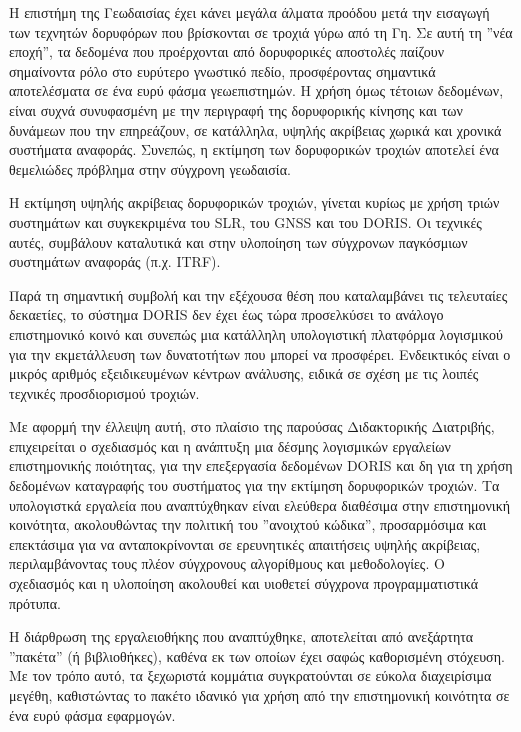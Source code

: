 Η επιστήμη της Γεωδαισίας έχει κάνει μεγάλα άλματα προόδου μετά την εισαγωγή των τεχνητών
δορυφόρων που βρίσκονται σε τροχιά γύρω από τη Γη. Σε αυτή τη ''νέα εποχή'', τα δεδομένα που
προέρχονται από δορυφορικές αποστολές παίζουν σημαίνοντα ρόλο στο ευρύτερο γνωστικό πεδίο,
προσφέροντας σημαντικά αποτελέσματα σε ένα ευρύ φάσμα γεωεπιστημών. Η χρήση όμως τέτοιων
δεδομένων, είναι συχνά συνυφασμένη με την περιγραφή της δορυφορικής κίνησης και των δυνάμεων που
την επηρεάζουν, σε κατάλληλα, υψηλής ακρίβειας χωρικά και χρονικά συστήματα αναφοράς. Συνεπώς, η
εκτίμηση των δορυφορικών τροχιών αποτελεί ένα θεμελιώδες πρόβλημα στην σύγχρονη γεωδαισία.


Η εκτίμηση υψηλής ακρίβειας δορυφορικών τροχιών, γίνεται κυρίως με χρήση τριών συστημάτων και
συγκεκριμένα του \textlatin{SLR}, του \textlatin{GNSS} και του \textlatin{DORIS}. Οι τεχνικές αυτές,
συμβάλουν καταλυτικά και στην υλοποίηση των σύγχρονων παγκόσμιων συστημάτων αναφοράς (π.χ.
\textlatin{ITRF}).


Παρά τη σημαντική συμβολή και την εξέχουσα θέση που καταλαμβάνει τις τελευταίες δεκαετίες, το
σύστημα \textlatin{DORIS} δεν έχει έως τώρα προσελκύσει το ανάλογο επιστημονικό κοινό και συνεπώς
μια κατάλληλη υπολογιστική πλατφόρμα λογισμικού για την εκμετάλλευση των δυνατοτήτων που μπορεί
να προσφέρει. Ενδεικτικός είναι ο μικρός αριθμός εξειδικευμένων κέντρων ανάλυσης, ειδικά σε σχέση με
τις λοιπές τεχνικές προσδιορισμού τροχιών.


Με αφορμή την έλλειψη αυτή, στο πλαίσιο της παρούσας Διδακτορικής Διατριβής, επιχειρείται ο
σχεδιασμός και η ανάπτυξη μια δέσμης λογισμικών εργαλείων επιστημονικής ποιότητας, για την
επεξεργασία δεδομένων \textlatin{DORIS} και δη για τη χρήση δεδομένων καταγραφής του συστήματος
για την εκτίμηση δορυφορικών τροχιών. Τα υπολογιστκά εργαλεία που αναπτύχθηκαν είναι ελεύθερα
διαθέσιμα στην επιστημονική κοινότητα, ακολουθώντας την πολιτική του ''ανοιχτού κώδικα'',
προσαρμόσιμα και επεκτάσιμα για να ανταποκρίνονται σε ερευνητικές απαιτήσεις υψηλής ακρίβειας,
περιλαμβάνοντας τους πλέον σύγχρονους αλγορίθμους και μεθοδολογίες. Ο σχεδιασμός και η υλοποίηση
ακολουθεί και υιοθετεί σύγχρονα προγραμματιστικά πρότυπα.


Η διάρθρωση της εργαλειοθήκης που αναπτύχθηκε, αποτελείται από ανεξάρτητα ''πακέτα'' (ή
βιβλιοθήκες), καθένα εκ των οποίων έχει σαφώς καθορισμένη στόχευση. Με τον τρόπο αυτό, τα
ξεχωριστά κομμάτια συγκρατούνται σε εύκολα διαχειρίσιμα μεγέθη, καθιστώντας το πακέτο ιδανικό για
χρήση από την επιστημονική κοινότητα σε ένα ευρύ φάσμα εφαρμογών.


